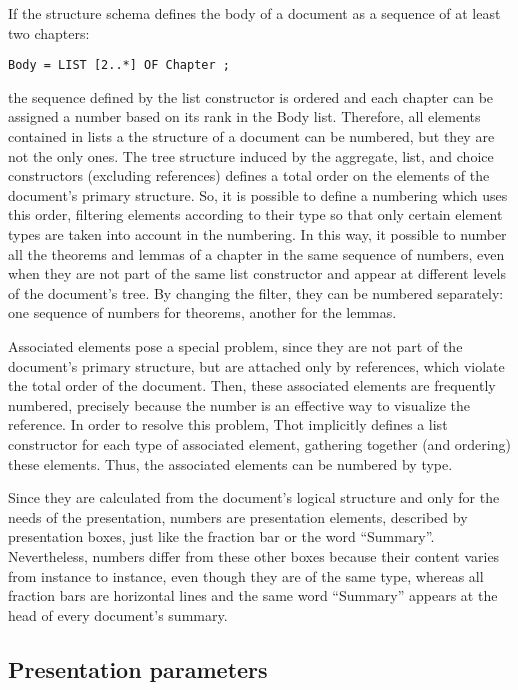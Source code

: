 If the structure schema defines the body of a document as a sequence
of at least two chapters:
\begin{verbatim}
Body = LIST [2..*] OF Chapter ;
\end{verbatim}
the sequence defined by the list constructor is ordered and each
chapter can be assigned a number based on its rank in the Body list.
Therefore, all elements contained in lists a the structure of a
document can be numbered, but they are not the only ones.  The tree
structure induced by the aggregate, list, and choice constructors
(excluding references) defines a total order on the elements of the
document's primary structure.  So, it is possible to define a
numbering which uses this order, filtering elements according to their
type so that only certain element types are taken into account in the
numbering.  In this way, it possible to number all the theorems and
lemmas of a chapter in the same sequence of numbers, even when they
are not part of the same list constructor and appear at different
levels of the document's tree.  By changing the filter, they can be
numbered separately: one sequence of numbers for theorems, another for
the lemmas.

Associated elements pose a special problem, since they are not part of
the document's primary structure, but are attached only by references,
which violate the total order of the document.  Then, these associated
elements are frequently numbered, precisely because the number is an
effective way to visualize the reference.  In order to resolve this
problem, Thot implicitly defines a list constructor for each type
of associated element, gathering together (and ordering) these
elements.  Thus, the associated elements can be numbered by type.

Since they are calculated from the document's logical structure and
only for the needs of the presentation, numbers are presentation
elements, described by presentation boxes, just like the fraction bar
or the word ``Summary''.  Nevertheless, numbers differ from these
other boxes because their content varies from instance to instance,
even though they are of the same type, whereas all fraction bars are
horizontal lines and the same word ``Summary'' appears at the head of
every document's summary.

\subsection{Presentation parameters}

